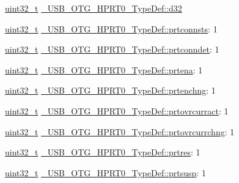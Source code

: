 \begin{DoxyCompactItemize}
\begin{tabbing}
\end{tabbing}\item 
\hyperlink{stdint_8h_a435d1572bf3f880d55459d9805097f62}{uint32\-\_\-t} \hyperlink{group___u_s_b___o_t_g___d_r_i_v_e_r_ga12e80fae082acbf526a1042c213b9a2b}{\-\_\-\-U\-S\-B\-\_\-\-O\-T\-G\-\_\-\-H\-P\-R\-T0\-\_\-\-Type\-Def\-::d32}
\item 
\hyperlink{stdint_8h_a435d1572bf3f880d55459d9805097f62}{uint32\-\_\-t} \hyperlink{group___u_s_b___o_t_g___d_r_i_v_e_r_ga80c85f29776c859b982bffa2d57a61c0}{\-\_\-\-U\-S\-B\-\_\-\-O\-T\-G\-\_\-\-H\-P\-R\-T0\-\_\-\-Type\-Def\-::prtconnsts}\-: 1
\item 
\hyperlink{stdint_8h_a435d1572bf3f880d55459d9805097f62}{uint32\-\_\-t} \hyperlink{group___u_s_b___o_t_g___d_r_i_v_e_r_ga7c3212cf708588fcd8823f2fe4c171af}{\-\_\-\-U\-S\-B\-\_\-\-O\-T\-G\-\_\-\-H\-P\-R\-T0\-\_\-\-Type\-Def\-::prtconndet}\-: 1
\item 
\hyperlink{stdint_8h_a435d1572bf3f880d55459d9805097f62}{uint32\-\_\-t} \hyperlink{group___u_s_b___o_t_g___d_r_i_v_e_r_ga36818f9fe8a4bbdeb764b5426ea40a52}{\-\_\-\-U\-S\-B\-\_\-\-O\-T\-G\-\_\-\-H\-P\-R\-T0\-\_\-\-Type\-Def\-::prtena}\-: 1
\item 
\hyperlink{stdint_8h_a435d1572bf3f880d55459d9805097f62}{uint32\-\_\-t} \hyperlink{group___u_s_b___o_t_g___d_r_i_v_e_r_ga328646f280716f47c42621dd7e06f0a9}{\-\_\-\-U\-S\-B\-\_\-\-O\-T\-G\-\_\-\-H\-P\-R\-T0\-\_\-\-Type\-Def\-::prtenchng}\-: 1
\item 
\hyperlink{stdint_8h_a435d1572bf3f880d55459d9805097f62}{uint32\-\_\-t} \hyperlink{group___u_s_b___o_t_g___d_r_i_v_e_r_ga01b37bd5f68839474255967be14ae78c}{\-\_\-\-U\-S\-B\-\_\-\-O\-T\-G\-\_\-\-H\-P\-R\-T0\-\_\-\-Type\-Def\-::prtovrcurract}\-: 1
\item 
\hyperlink{stdint_8h_a435d1572bf3f880d55459d9805097f62}{uint32\-\_\-t} \hyperlink{group___u_s_b___o_t_g___d_r_i_v_e_r_ga02e861d33c684c8025cce67ce2ef59e8}{\-\_\-\-U\-S\-B\-\_\-\-O\-T\-G\-\_\-\-H\-P\-R\-T0\-\_\-\-Type\-Def\-::prtovrcurrchng}\-: 1
\item 
\hyperlink{stdint_8h_a435d1572bf3f880d55459d9805097f62}{uint32\-\_\-t} \hyperlink{group___u_s_b___o_t_g___d_r_i_v_e_r_ga159a812d06243cc7e536c4439ca4812b}{\-\_\-\-U\-S\-B\-\_\-\-O\-T\-G\-\_\-\-H\-P\-R\-T0\-\_\-\-Type\-Def\-::prtres}\-: 1
\item 
\hyperlink{stdint_8h_a435d1572bf3f880d55459d9805097f62}{uint32\-\_\-t} \hyperlink{group___u_s_b___o_t_g___d_r_i_v_e_r_gaf714b32bdd6fe785663dc5bebc92ee0e}{\-\_\-\-U\-S\-B\-\_\-\-O\-T\-G\-\_\-\-H\-P\-R\-T0\-\_\-\-Type\-Def\-::prtsusp}\-: 1

\end{DoxyCompactItemize}
